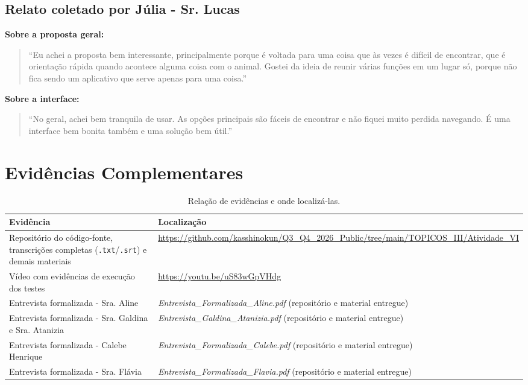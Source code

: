 \documentclass[
    12pt,
    openright,
    oneside,
    a4paper
]{abntex2}
\begin{document}
\section{Relato coletado por Júlia - Sr. Lucas}
\textbf{Sobre a proposta geral:}
\begin{quote}
\enquote{Eu achei a proposta bem interessante, principalmente porque é voltada para uma coisa
que às vezes é difícil de encontrar, que é orientação rápida quando acontece alguma coisa com
o animal. Gostei da ideia de reunir várias funções em um lugar só, porque não fica sendo um
aplicativo que serve apenas para uma coisa.}
\end{quote}
\textbf{Sobre a interface:}
\begin{quote}
\enquote{No geral, achei bem tranquila de usar. As opções principais são fáceis de encontrar e
não fiquei muito perdida navegando. É uma interface bem bonita também e uma solução bem
útil.}
\end{quote}

\chapter{Evidências Complementares}

\begin{table}[H]
\centering
\small
\begin{tabular}{@{}>{\raggedright\arraybackslash}p{4cm}p{9.5cm}@{}}
\toprule
\textbf{Evidência} & \textbf{Localização} \\
\midrule
Repositório do código-fonte, transcrições completas (\texttt{.txt}/\texttt{.srt}) e demais
materiais & \url{https://github.com/kasshinokun/Q3_Q4_2026_Public/tree/main/TOPICOS_III/Atividade_VI} \\
\addlinespace
Vídeo com evidências de execução dos testes & \url{https://youtu.be/uS83wGpVHdg} \\
\addlinespace
Entrevista formalizada - Sra. Aline & \textit{Entrevista\_Formalizada\_Aline.pdf} (repositório e
material entregue) \\
\addlinespace
Entrevista formalizada - Sra. Galdina e Sra. Atanizia & \textit{Entrevista\_Galdina\_Atanizia.pdf}
(repositório e material entregue) \\
\addlinespace
Entrevista formalizada - Calebe Henrique & \textit{Entrevista\_Formalizada\_Calebe.pdf}
(repositório e material entregue) \\
\addlinespace
Entrevista formalizada - Sra. Flávia & \textit{Entrevista\_Formalizada\_Flavia.pdf}
(repositório e material entregue) \\
\bottomrule
\end{tabular}
\caption{Relação de evidências e onde localizá-las.}
\end{table}
\end{document}
